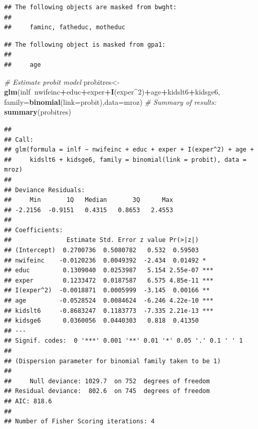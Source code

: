 \documentclass[]{book}
\newenvironment{Shaded}{\begin{snugshade}}{\end{snugshade}}
\newcommand{\CommentTok}[1]{\textcolor[rgb]{0.56,0.35,0.01}{\textit{#1}}}
\newcommand{\DataTypeTok}[1]{\textcolor[rgb]{0.13,0.29,0.53}{#1}}
\newcommand{\DecValTok}[1]{\textcolor[rgb]{0.00,0.00,0.81}{#1}}
\newcommand{\KeywordTok}[1]{\textcolor[rgb]{0.13,0.29,0.53}{\textbf{#1}}}
\newcommand{\NormalTok}[1]{#1}
\newcommand{\OperatorTok}[1]{\textcolor[rgb]{0.81,0.36,0.00}{\textbf{#1}}}
\begin{document}
\begin{verbatim}
## The following objects are masked from bwght:
## 
##     faminc, fatheduc, motheduc
\end{verbatim}

\begin{verbatim}
## The following object is masked from gpa1:
## 
##     age
\end{verbatim}

\begin{Shaded}
\begin{Highlighting}[]
\CommentTok{# Estimate probit model}
\NormalTok{probitres<-}\KeywordTok{glm}\NormalTok{(inlf}\OperatorTok{~}\NormalTok{nwifeinc}\OperatorTok{+}\NormalTok{educ}\OperatorTok{+}\NormalTok{exper}\OperatorTok{+}\KeywordTok{I}\NormalTok{(exper}\OperatorTok{^}\DecValTok{2}\NormalTok{)}\OperatorTok{+}\NormalTok{age}\OperatorTok{+}\NormalTok{kidslt6}\OperatorTok{+}\NormalTok{kidsge6,}
               \DataTypeTok{family=}\KeywordTok{binomial}\NormalTok{(}\DataTypeTok{link=}\NormalTok{probit),}\DataTypeTok{data=}\NormalTok{mroz)}
\CommentTok{# Summary of results:}
\KeywordTok{summary}\NormalTok{(probitres)}
\end{Highlighting}
\end{Shaded}

\begin{verbatim}
## 
## Call:
## glm(formula = inlf ~ nwifeinc + educ + exper + I(exper^2) + age + 
##     kidslt6 + kidsge6, family = binomial(link = probit), data = mroz)
## 
## Deviance Residuals: 
##     Min       1Q   Median       3Q      Max  
## -2.2156  -0.9151   0.4315   0.8653   2.4553  
## 
## Coefficients:
##               Estimate Std. Error z value Pr(>|z|)    
## (Intercept)  0.2700736  0.5080782   0.532  0.59503    
## nwifeinc    -0.0120236  0.0049392  -2.434  0.01492 *  
## educ         0.1309040  0.0253987   5.154 2.55e-07 ***
## exper        0.1233472  0.0187587   6.575 4.85e-11 ***
## I(exper^2)  -0.0018871  0.0005999  -3.145  0.00166 ** 
## age         -0.0528524  0.0084624  -6.246 4.22e-10 ***
## kidslt6     -0.8683247  0.1183773  -7.335 2.21e-13 ***
## kidsge6      0.0360056  0.0440303   0.818  0.41350    
## ---
## Signif. codes:  0 '***' 0.001 '**' 0.01 '*' 0.05 '.' 0.1 ' ' 1
## 
## (Dispersion parameter for binomial family taken to be 1)
## 
##     Null deviance: 1029.7  on 752  degrees of freedom
## Residual deviance:  802.6  on 745  degrees of freedom
## AIC: 818.6
## 
## Number of Fisher Scoring iterations: 4
\end{verbatim}
\end{document}
